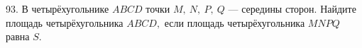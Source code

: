93. В четырёхугольнике $ABCD$ точки $M,\ N,\ P,\ Q$ --- середины сторон. Найдите площадь четырёхугольника $ABCD,$ если площадь четырёхугольника $MNPQ$ равна $S.$\\
